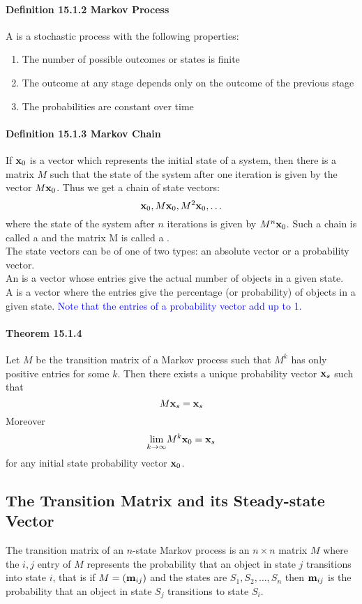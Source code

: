 \documentclass[11pt]{article}
\begin{document}
\paragraph{Definition 15.1.2 Markov Process}
A  is a stochastic process with the following properties:
\begin{enumerate}
	\item The number of possible outcomes or states is finite
	\item The outcome at any stage depends only on the outcome of the previous stage
	\item The probabilities are constant over time
\end{enumerate}
 
\paragraph{Definition 15.1.3 Markov Chain}
If $\textbf{x}_0$ is a vector which represents the initial state of a system, then there is a matrix $M$ such that the state of the system after one iteration is given by the vector $M\textbf{x}_0$. Thus we get a chain of state vectors:
$$\textbf{x}_0, M\textbf{x}_0, M^2\textbf{x}_0, \hdots$$
where the state of the system after $n$ iterations is given by $M^n\textbf{x}_0$. Such a chain is called a  and the matrix M is called a . \\
The state vectors can be of one of two types: an absolute vector or a probability vector.\\ 
An  is a vector whose entries give the actual number of objects in a given state. \\
A  is a vector where the entries give the percentage (or probability) of objects in a given state. \textcolor{blue}{Note that the entries of a probability vector add up to 1.}
\paragraph{Theorem 15.1.4}
Let $M$ be the transition matrix of a Markov process such that $M^k$ has only positive entries for some $k$. Then there exists a unique probability vector $\textbf{x}_s$ such that $$M\textbf{x}_s = \textbf{x}_s$$
Moreover
$$\underset{k \rightarrow \infty}{\lim} M^k\textbf{x}_0 = \textbf{x}_s$$
for any initial state probability vector $\textbf{x}_0$.

\subsection{The Transition Matrix and its Steady-state Vector}
The transition matrix of an $n$-state Markov process is an $n\times n$ matrix $M$ where the $i,j$ entry of $M$ represents the probability that an object in state $j$ transitions into state $i$, that is if $M = (\textbf{m}_{ij})$ and the states are $S_1, S_2, \hdots, S_n$ then $\textbf{m}_{ij}$ is the probability that an object in state $S_j$ transitions to state $S_i$.
\end{document}
